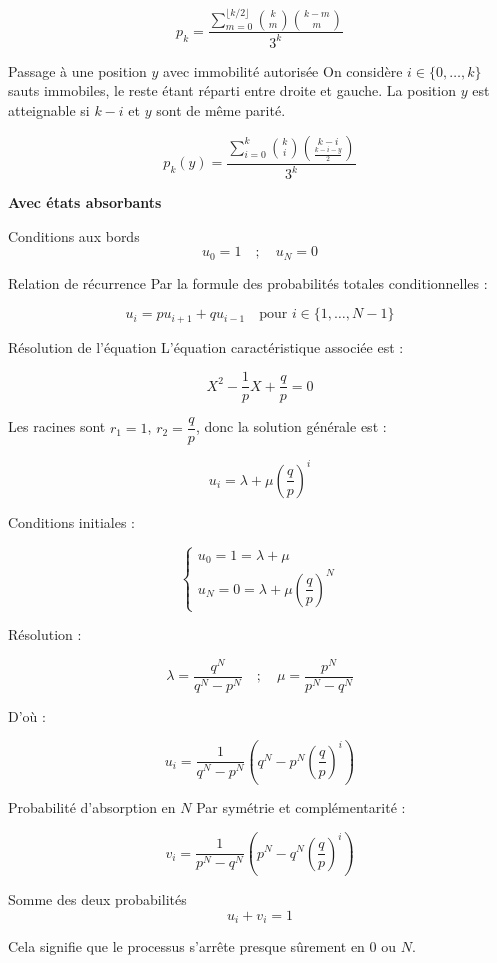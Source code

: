 \documentclass[10pt,a4paper]{article}
\begin{document}
\[
\boxed{p_k = \dfrac{\displaystyle \sum_{m=0}^{\lfloor k/2 \rfloor} \binom{k}{m} \binom{k - m}{m}}{3^k}}
\]

\q Passage à une position \( y \) avec immobilité autorisée
On considère \( i \in \{0, \dots, k\} \) sauts immobiles, le reste étant réparti entre droite et
gauche. La position \( y \) est atteignable si \( k - i \) et \( y \) sont de même parité.

\[
\boxed{p_k(y) = \dfrac{\displaystyle \sum_{i = 0}^{k} \binom{k}{i} \binom{k - i}{\frac{k - i - y}{2}}}{3^k}}
\]

\bigskip

\textbf{Avec états absorbants}

\q Conditions aux bords
\[
\boxed{u_0 = 1 \quad ; \quad u_N = 0}
\]

\q Relation de récurrence
Par la formule des probabilités totales conditionnelles :

\[
\boxed{u_i = p u_{i+1} + q u_{i-1} \quad \text{pour } i \in \{1, \dots, N-1\}}
\]

\q Résolution de l'équation
L'équation caractéristique associée est :

\[
X^2 - \dfrac{1}{p} X + \dfrac{q}{p} = 0
\]

Les racines sont \( r_1 = 1 \), \( r_2 = \dfrac{q}{p} \), donc la solution générale est :

\[
u_i = \lambda + \mu \left( \dfrac{q}{p} \right)^i
\]

Conditions initiales :

\[
\begin{cases}
u_0 = 1 = \lambda + \mu \\
u_N = 0 = \lambda + \mu \left( \dfrac{q}{p} \right)^N
\end{cases}
\]

Résolution :

\[
\lambda = \dfrac{q^N}{q^N - p^N} \quad ; \quad \mu = \dfrac{p^N}{p^N - q^N}
\]

D'où :

\[
\boxed{u_i = \dfrac{1}{q^N - p^N} \left( q^N - p^N \left( \dfrac{q}{p} \right)^i \right)}
\]

\q Probabilité d'absorption en \( N \)
Par symétrie et complémentarité :

\[
\boxed{v_i = \dfrac{1}{p^N - q^N} \left( p^N - q^N \left( \dfrac{q}{p} \right)^i \right)}
\]

\q Somme des deux probabilités
\[
\boxed{u_i + v_i = 1}
\]

Cela signifie que le processus s'arrête presque sûrement en \( 0 \) ou \( N \).
\end{document}
